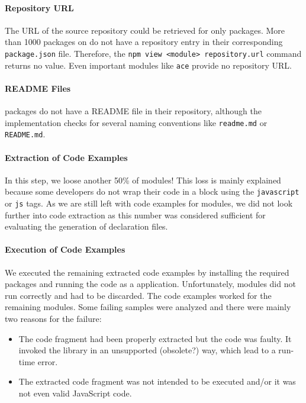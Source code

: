 \documentclass[sigconf]{acmart}
\begin{document}
\paragraph*{Repository URL}
The URL of the source repository could be retrieved for only \CountModulesWithRepositoryUrl{}
packages. More than 1000 packages on \NPM{} do not have a repository
entry in their corresponding \texttt{package.json} file. Therefore, the
\texttt{npm view <module> repository.url} command returns no
value. Even important modules like \texttt{ace} provide no repository URL.

\paragraph*{README Files}
\CountModulesWithoutReadmeFile{} packages do not have a README file in their repository, although
the implementation checks for several naming conventions like
\texttt{readme.md} or \texttt{README.md}. 

\paragraph*{Extraction of Code Examples}
In this step, we loose another 50\% of modules! This loss is mainly
explained because some developers do not wrap their code in a block
using the \texttt{javascript} or \texttt{js} tags. As we are
still left with code examples for \CountModulesWithCodeExamples{} modules, we did not look
further into code extraction as this number was considered sufficient for
evaluating the generation of declaration files. 

\paragraph*{Execution of Code Examples}
We executed the remaining \CountModulesWithCodeExamples{} extracted code examples by installing the
required packages and running the code as a \NodeJS{}
application. Unfortunately,
\CountModulesNotWorkingCodeExamples{} modules did not run correctly and had to be
discarded.
The code examples worked for the remaining \CountModulesWorkingCodeExamples{}
modules.
Some failing samples were analyzed and there were mainly
two reasons for the failure: 
\begin{itemize}
\item The code fragment had been properly extracted but the code was
  faulty. It invoked the library in an unsupported
  (obsolete?) way, which lead to a run-time error.
\item The extracted code fragment was not intended to be executed
  and/or it was not even valid JavaScript code. 
\end{itemize}
\end{document}
